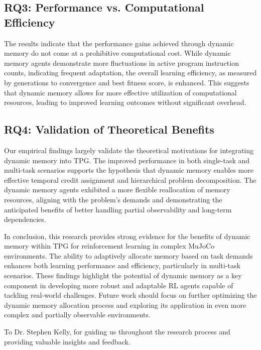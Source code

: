\documentclass[sigconf]{acmart}
\begin{document}
\subsection{RQ3: Performance vs. Computational Efficiency}
The results indicate that the performance gains achieved through dynamic memory do not come at a 
prohibitive computational cost. While dynamic memory agents demonstrate more fluctuations in active 
program instruction counts, indicating frequent adaptation, the overall learning efficiency, as measured 
by generations to convergence and best fitness score, is enhanced. This suggests that dynamic memory 
allows for more effective utilization of computational resources, leading to improved learning outcomes without significant overhead.

\subsection{RQ4: Validation of Theoretical Benefits}
Our empirical findings largely validate the theoretical motivations 
for integrating dynamic memory into TPG. The improved performance in both single-task and multi-task scenarios supports 
the hypothesis that dynamic memory enables more effective temporal credit assignment and hierarchical problem decomposition. 
The dynamic memory agents exhibited a more flexible reallocation of memory resources, aligning with the problem's demands 
and demonstrating the anticipated benefits of better handling partial observability and long-term dependencies.

In conclusion, this research provides strong evidence for the benefits of dynamic memory within TPG for reinforcement 
learning in complex MuJoCo environments. The ability to adaptively allocate memory based on task demands enhances both 
learning performance and efficiency, particularly in multi-task scenarios. These findings highlight the potential of 
dynamic memory as a key component in developing more robust and adaptable RL agents capable of tackling real-world challenges. 
Future work should focus on further optimizing the dynamic memory allocation process and exploring its application 
in even more complex and partially observable environments.

\begin{acks}
To Dr. Stephen Kelly, for guiding us throughout the research process and providing valuable insights and feedback.
\end{acks}




\end{document}
